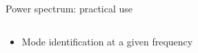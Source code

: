 \documentclass[t,10pt]{beamer}
\begin{document}
\begin{frame}{Power spectrum: practical use}
\begin{columns}[b]
\begin{column}{.5\textwidth}
\begin{itemize}
\item \textcolor{ta3scarletred}{Mode identification at a given
    frequency {\footnotesize \parencite{Conway:2005gq}}}
\end{itemize}
\end{column}
\begin{column}{0.5\textwidth}
\end{column}
\end{columns}

\vspace{0.5cm}


\end{frame}
\end{document}
